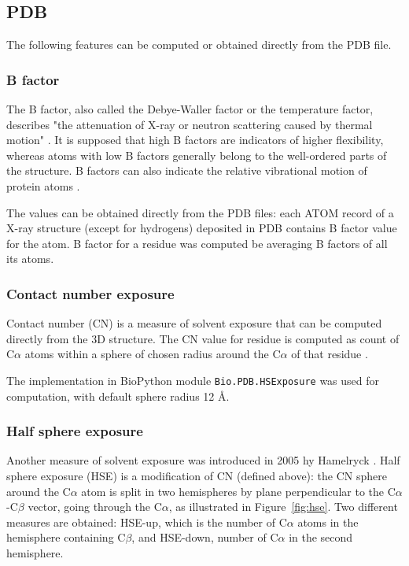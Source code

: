 \subsection{PDB}

The following features can be computed or obtained directly from the PDB file.

\subsubsection{B factor}

The B factor, also called the Debye-Waller factor or the temperature factor, describes "the attenuation of X-ray or neutron scattering caused by thermal motion" \cite{bfactor}. It is supposed that high B factors are indicators of higher flexibility, whereas atoms with low B factors generally belong to the well-ordered parts of the structure. B factors can also indicate the relative vibrational motion of protein atoms \cite{bfactor}.

The values can be obtained directly from the PDB files: each ATOM record of a X-ray structure (except for hydrogens) deposited in PDB contains B factor value for the atom. B factor for a residue was computed be averaging B factors of all its atoms. 

\subsubsection{Contact number exposure}

Contact number (CN) is a measure of solvent exposure that can be computed directly from the 3D structure. The CN value for residue is computed as count of C$\alpha$ atoms within a sphere of chosen radius around the C$\alpha$ of that residue \cite{cn}.

The implementation in BioPython module \texttt{Bio.PDB.HSExposure} was used for computation, with default sphere radius 12 {\AA}.


\subsubsection{Half sphere exposure}

Another measure of solvent exposure was introduced in 2005 hy Hamelryck \cite{hse}. Half sphere exposure (HSE) is a modification of CN (defined above): the CN sphere around the C$\alpha$ atom is split in two hemispheres by plane perpendicular to the C$\alpha$-C$\beta$ vector, going through the C$\alpha$, as illustrated in Figure~\ref{fig:hse}. Two different measures are obtained: HSE-up, which is the number of C$\alpha$ atoms in the hemisphere containing C$\beta$, and HSE-down, number of C$\alpha$ in the second hemisphere.

